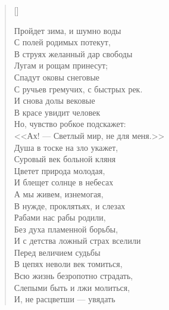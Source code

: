 \newpage
\vspace*{0cm}


\settowidth{\versewidth}{В струях желанный дар свободы}
\begin{verse}[\versewidth]
\begin{altverse}
Пройдет зима, и шумно воды\\
    С полей родимых потекут,\\
В струях желанный дар свободы\\
    Лугам и рощам принесут;\\
Спадут оковы снеговые\\
    С ручьев гремучих, с быстрых рек.\\
И снова долы вековые\\
    В красе увидит человек\ldotst\\
Но, чувство робкое подскажет:\\
    <<Ах! --- Светлый мир, не для меня.>>\\
Душа в тоске на зло укажет,\\
    Суровый век больной кляня\ldotst\\
Цветет природа молодая,\\
    И блещет солнце в небесах\ldotst\\
А мы живем, изнемогая,\\
    В нужде, проклятьях, и слезах\ldotst\\
Рабами нас рабы родили,\\
    Без духа пламенной борьбы,\\
И с детства ложный страх вселили\\
    Перед величием судьбы\ldotst\\
В цепях неволи век томиться,\\
    Всю жизнь безропотно страдать,\\
Слепыми быть и лжи молиться,\\
И, не расцветши --- увядать\ldotst
\end{altverse}
\end{verse}

\newpage
\vspace*{0cm}


